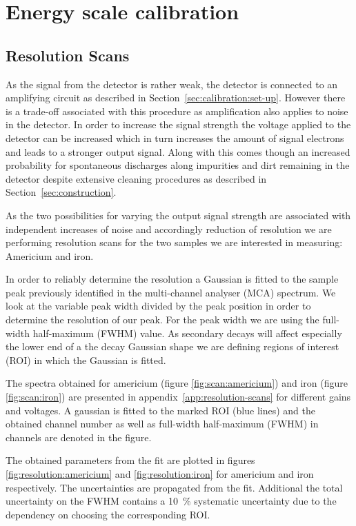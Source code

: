 \section{Energy scale calibration}

\subsection{Resolution Scans}
\label{sec:resolution_scans}
As the signal from the detector is rather weak, the detector is connected to an
amplifying circuit as described in Section~\ref{sec:calibration:set-up}. However
there is a trade-off associated with this procedure as amplification also
applies to noise in the detector. In order to increase the signal strength the
voltage applied to the detector can be increased which in turn increases the
amount of signal electrons and leads to a stronger output signal. Along with
this comes though an increased probability for spontaneous discharges along
impurities and dirt remaining in the detector despite extensive cleaning
procedures as described in Section~\ref{sec:construction}.

As the two possibilities for varying the output signal strength are associated
with independent increases of noise and accordingly reduction of resolution we
are performing resolution scans for the two samples we are interested in
measuring: Americium and iron.

In order to reliably determine the resolution a Gaussian is fitted to the sample
peak previously identified in the multi-channel analyser (MCA) spectrum. We look
at the variable peak width divided by the peak position in order to determine
the resolution of our peak. For the peak width we are using the full-width
half-maximum (FWHM) value. As secondary decays will affect especially the lower
end of a the decay Gaussian  shape we are defining regions of interest (ROI) in which the Gaussian
is fitted.

The spectra obtained for americium (figure \ref{fig:scan:americium}) and iron
(figure \ref{fig:scan:iron}) are presented in appendix~\ref{app:resolution-scans} for different gains and voltages.
A gaussian is fitted to the marked ROI (blue lines) and the obtained channel number as well as
full-width half-maximum (FWHM) in channels are denoted in the figure.

The obtained parameters from the fit are plotted in figures
\ref{fig:resolution:americium} and \ref{fig:resolution:iron} for americium and
iron respectively. The uncertainties are propagated from the fit. Additional the
total uncertainty on the FWHM contains a \SI{10}{\percent} systematic
uncertainty due to the dependency on choosing the corresponding ROI.

